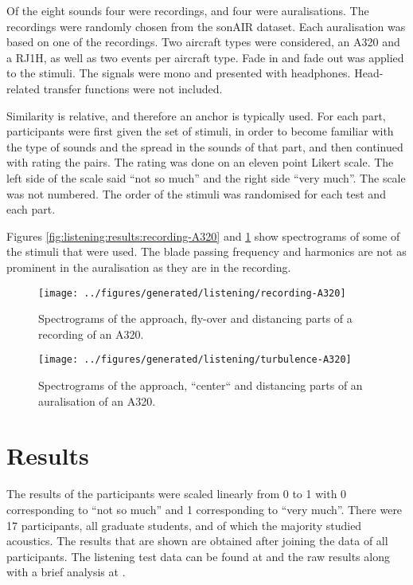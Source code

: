 Of the eight sounds four were recordings, and four were auralisations.
The recordings were randomly chosen from the sonAIR dataset. Each
auralisation was based on one of the recordings. Two aircraft types were
considered, an A320 and a RJ1H, as well as two events per aircraft type.
Fade in and fade out was applied to the stimuli. The signals were mono and
presented with headphones. Head-related transfer functions were not included.

Similarity is relative, and therefore an anchor is typically used. For each
part, participants were first given the set of stimuli, in order to become
familiar with the type of sounds and the spread in the sounds of that part, and
then continued with rating the pairs. The rating was done on an eleven point
Likert scale. The left side of the scale said ``not so much'' and the right side
``very much''. The scale was not numbered. The order of the stimuli was
randomised for each test and each part.

Figures \ref{fig:listening:results:recording-A320} and
\ref{fig:listening:results:simulation-A320} show spectrograms of some of the stimuli
that were used. The blade passing frequency and harmonics are not as prominent
in the auralisation as they are in the recording.

\begin{figure}[H]
  \centering
  \texttt{[image: ../figures/generated/listening/recording-A320]}
  \caption{Spectrograms of the approach, fly-over and distancing parts of a recording of an A320.}
  \label{fig:listening:results:recording-A320}
%
  \centering
  \texttt{[image: ../figures/generated/listening/turbulence-A320]}
  \caption{Spectrograms of the approach, ``center`` and distancing parts of an auralisation of an A320.}
  \label{fig:listening:results:simulation-A320}
\end{figure}

\newpage
\section{Results}
The results of the participants were scaled linearly from 0 to 1 with 0
corresponding to ``not so much'' and 1 corresponding to ``very much''.
There were 17 participants, all graduate students, and of which the majority
studied acoustics. The results that are shown are obtained after joining the
data of all participants. %
The listening test data can be found at \cite{Rietdijk2017a} and the
raw results along with a brief analysis at \cite{Rietdijk2017b}.

